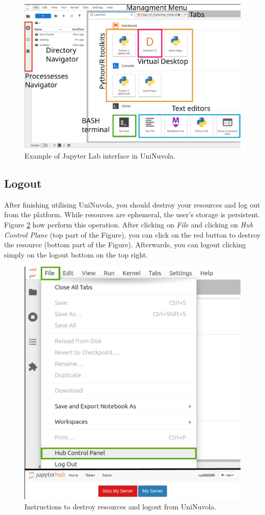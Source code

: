 \begin{figure}[!ht]
    \centering
    \includegraphics[width=0.8\linewidth]{img/uninuvola.pdf}
    \caption{Example of Jupyter Lab interface in UniNuvola.}
    \label{fig:uninuvola_main_page}
\end{figure}


\subsection{Logout}

After finishing utilising UniNuvola, you should destroy your resources and log out from the platform. While resources are ephemeral, the user's storage is persistent. Figure \ref{fig:destroy_res} how perform this operation. After clicking on \textit{File} and clicking on \textit{Hub Control Plane} (top part of the Figure), you can click on the red button to destroy the resource (bottom part of the Figure). Afterwards, you can logout clicking simply on the logout bottom on the top right. 

\begin{figure}[!ht]
    \centering
    \includegraphics[width=0.8\linewidth]{img/logout.pdf}
    \caption{Instructions to destroy resources and logout from UniNuvola.}
    \label{fig:destroy_res}
\end{figure}
